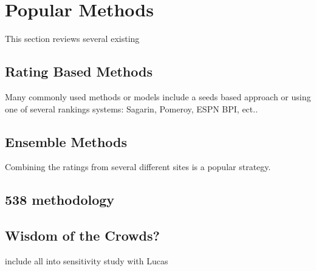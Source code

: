 \section{Popular Methods}  This section reviews several existing
\subsection{Rating Based Methods} 
Many commonly used methods or models include a seeds based approach or using one of several rankings systems: Sagarin, Pomeroy, ESPN BPI, ect..
\subsection{Ensemble Methods}
Combining the ratings from several different sites is a popular strategy.
\subsection{538 methodology}

\subsection{Wisdom of the Crowds?}

include all into sensitivity study with Lucas

